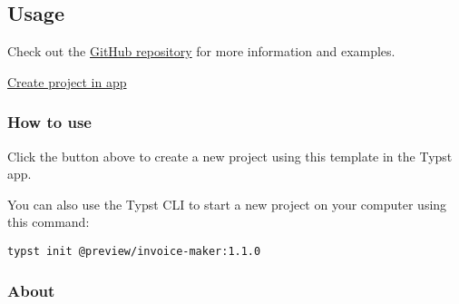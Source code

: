 \subsection{Usage}\label{usage}

\begin{Shaded}
\begin{Highlighting}[]

\NormalTok{)}
\end{Highlighting}
\end{Shaded}

Check out the \href{https://github.com/ad-si/invoice-maker}{GitHub
repository} for more information and examples.

\href{/app?template=invoice-maker&version=1.1.0}{Create project in app}

\subsubsection{How to use}\label{how-to-use}

Click the button above to create a new project using this template in
the Typst app.

You can also use the Typst CLI to start a new project on your computer
using this command:

\begin{verbatim}
typst init @preview/invoice-maker:1.1.0
\end{verbatim}



\subsubsection{About}\label{about}

